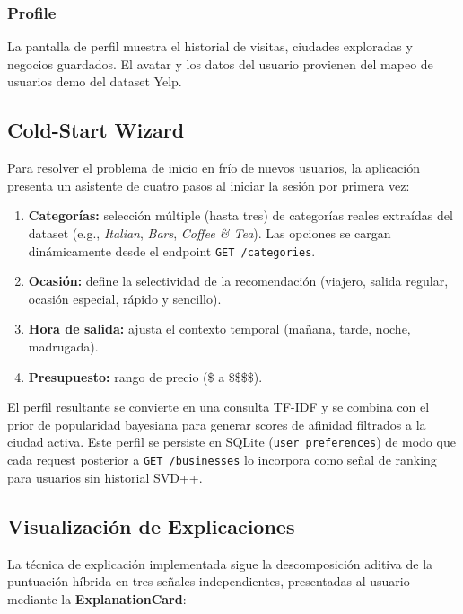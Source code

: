 \documentclass[11pt,a4paper]{article}
\begin{document}
\subsubsection*{Profile}

La pantalla de perfil muestra el historial de visitas, ciudades exploradas y negocios guardados. El avatar y los datos del usuario provienen del mapeo de usuarios demo del dataset Yelp.

\subsection{Cold-Start Wizard}
\label{ssec:coldstart}

Para resolver el problema de inicio en frío de nuevos usuarios, la aplicación presenta un asistente de cuatro pasos al iniciar la sesión por primera vez:

\begin{enumerate}
    \item \textbf{Categorías:} selección múltiple (hasta tres) de categorías reales extraídas del dataset (e.g., \textit{Italian}, \textit{Bars}, \textit{Coffee \& Tea}). Las opciones se cargan dinámicamente desde el endpoint \texttt{GET /categories}.
    \item \textbf{Ocasión:} define la selectividad de la recomendación (viajero, salida regular, ocasión especial, rápido y sencillo).
    \item \textbf{Hora de salida:} ajusta el contexto temporal (mañana, tarde, noche, madrugada).
    \item \textbf{Presupuesto:} rango de precio (\$ a \$\$\$\$).
\end{enumerate}

El perfil resultante se convierte en una consulta TF-IDF y se combina con el prior de popularidad bayesiana para generar scores de afinidad filtrados a la ciudad activa. Este perfil se persiste en SQLite (\texttt{user\_preferences}) de modo que cada request posterior a \texttt{GET /businesses} lo incorpora como señal de ranking para usuarios sin historial SVD++.

\subsection{Visualización de Explicaciones}
\label{ssec:expl}

La técnica de explicación implementada sigue la descomposición aditiva de la puntuación híbrida en tres señales independientes, presentadas al usuario mediante la \textbf{ExplanationCard}:
\end{document}
